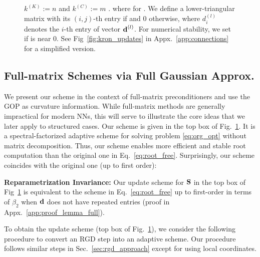 \begin{figure*}[!t]
\begin{minipage}[t]{.45\linewidth}
{{$k^{(K)}:=n$ and 
$k^{(C)}:=m$ }.
  where  for .
%
We define a lower-triangular matrix   with its $(i,j)$-th entry  if  and $0$ otherwise, where $d^{(l)}_i$ denotes the $i$-th entry of vector $\mbox{$\mbox{$\mathbf{d}$}$}^{(l)}$.  
For numerical stability, we set  if  is near $0$.
%
See Fig~\ref{fig:kron_updates} in Appx.~\ref{app:connections} for a simplified version.
}\label{fig:kronecker}
\end{minipage}
\vspace{-0.5cm}
\end{figure*}



\vspace{-0.3cm}
\subsection{Full-matrix Schemes via Full Gaussian Approx.}
\label{sec:full_mat_update}
\vspace{-0.15cm}
We present our scheme in the context of full-matrix preconditioners and use the GOP as curvature information. While full-matrix methods are generally impractical for modern NNs, this will serve to illustrate the core ideas that we later apply to structured cases.
Our scheme is given in the top box of Fig.~\ref{fig:kronecker}.
It is a spectral-factorized adaptive scheme for solving problem \eqref{eq:org_opt} without matrix decomposition.
Thus, our scheme enables more efficient and stable root computation than the original one in Eq.~\eqref{eq:root_free}.
Surprisingly, our scheme coincides with the original one (up to first order):

\vspace{-0.05cm}
\begin{claim}
\label{claim:eigen_full_mat_case}
 \textbf{Reparametrization Invariance:} 
  Our update scheme for $\mbox{$\mbox{$\mathbf{S}$}$}$ in the top box of Fig~\ref{fig:kronecker} is equivalent to the scheme in Eq.~\eqref{eq:root_free} up to first-order in terms of $\beta_2$ when $\mbox{$\mbox{$\mathbf{d}$}$}$ does not have repeated entries (proof in Appx.~\ref{app:proof_lemma_full}).
\end{claim}

\vspace{-0.2cm}
To obtain the update scheme (top box of Fig.~\ref{fig:kronecker}), we consider the following procedure to convert an RGD step into an adaptive scheme.
Our procedure follows similar steps in Sec.~\ref{sec:rgd_approach} except for using local coordinates.

